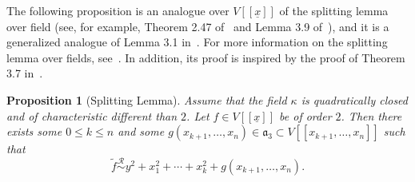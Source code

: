 \documentclass{article}
\newtheorem{proposition}[theorem]{Proposition}
\newcommand{\equivr}{\overset{\mathcal{R}}{\sim}}
\numberwithin{theorem}{section}
\begin{document}
The following proposition is an analogue over $V[[\underline{x}]]$ of the splitting lemma over field (see, for example, Theorem 2.47 of~\cite{greuel2007introduction} and Lemma 3.9 of~\cite{greuel2016right}), and it is a generalized analogue of Lemma 3.1 in~\cite{carvajal2019covers}. For more information on the splitting lemma over fields, see~\cite{greuel2025splitting}. In addition, its proof is inspired by the proof of Theorem 3.7 in~\cite{svoray2025ade}. 



\begin{proposition}[Splitting Lemma]\label{prop:splitting}
Assume that the field $\kappa$ is quadratically closed and of characteristic different than $2$. Let $f \in V[[\underline{x}]]$ be of order $2$. Then there exists some $0 \leq k \leq n$ and some $g\left(x_{k+1}, \dots, x_n\right) \in \mathfrak{a}_3 \subset V[[x_{k+1}, \dots, x_n]]$  such that 
\begin{equation*}
    \tilde{f} \equivr y^2 + x_1^2 +\cdots + x_k^2 + g\left(x_{k+1}, \dots, x_n\right).
\end{equation*}  
\end{proposition}
\end{document}
